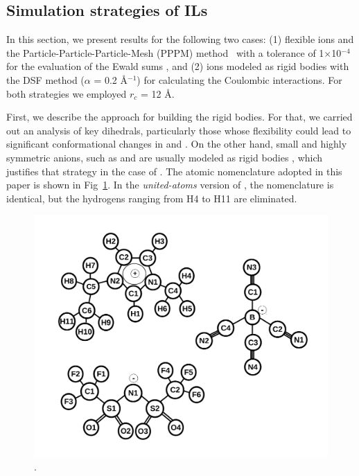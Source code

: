 \documentclass[3p,twocolumn]{elsarticle}
\begin{document}
\subsection{Simulation strategies of ILs}
\label{sec:prel_results}

In this section, we present results for the following two cases: (1) flexible ions and the Particle-Particle-Particle-Mesh (PPPM) method~\cite{Hockney_1988} with a tolerance of 1$\times$10$^{-4}$ for the evaluation of the Ewald sums \cite{Ewald_1921}, and (2) ions modeled as rigid bodies with the DSF method \cite{Fennell2006} ($\alpha$ = 0.2 {\AA}$^{-1}$) for calculating the Coulombic interactions. For both strategies we employed $r_c$ = 12 {\AA}.

First, we describe the approach for building the rigid bodies. For that, we carried out an analysis of key dihedrals, particularly those whose flexibility could lead to significant conformational changes in \ce{[emim]^+} and \ce{[Tf_2N]^-}. On the other hand, small and highly symmetric anions, such as  and  are usually modeled as rigid bodies \cite{HANKE_2001,Hanke_2003,Lynden_Bell_2006}, which justifies that strategy in the case of \ce{[B(CN)_4]^-}. The atomic nomenclature adopted in this paper is shown in Fig~\ref{fig:atoms_id}. In the \textit{united-atoms} version of \ce{[emim]^+}, the nomenclature is identical, but the hydrogens ranging from H4 to H11 are eliminated.

\begin{figure}[H]
\centering
\includegraphics[width=\linewidth]{ions_paper.pdf}
\caption{\ce{[emim]^+} \ce{[B(CN)_4]^-} \ce{[NTf_2]^-}.}
\label{fig:atoms_id}
\end{figure}
\end{document}
